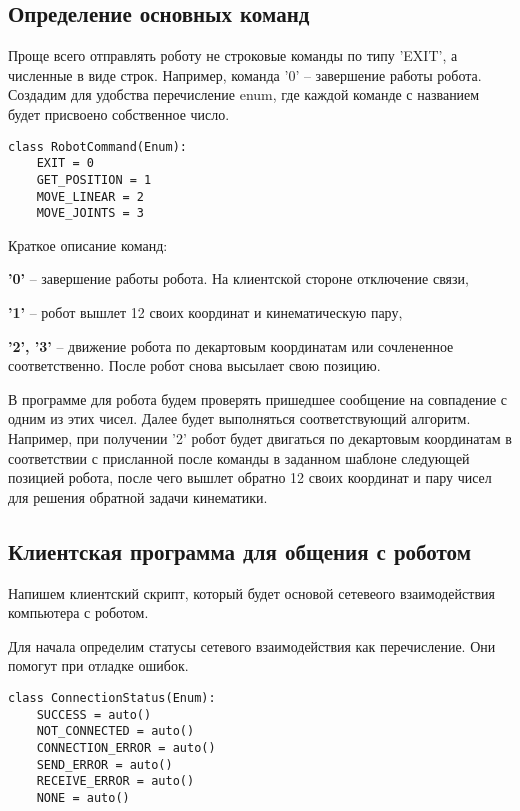 \documentclass[a4paper,14pt]{extarticle}
\begin{document}
\subsection{Определение основных команд}
Проще всего отправлять роботу не строковые команды по типу 'EXIT',
а численные в виде строк. Например, команда '0' -- завершение работы
робота. Создадим для удобства перечисление enum, где каждой
команде с названием будет присвоено собственное число.
\begin{lstlisting}[label=robocmd, caption={Определение перечисления с командами для робота.}]
class RobotCommand(Enum):
    EXIT = 0
    GET_POSITION = 1
    MOVE_LINEAR = 2
    MOVE_JOINTS = 3
\end{lstlisting}


Краткое описание команд:
\begin{compactitem}
    \item \textbf{'0'} -- завершение работы робота. На клиентской стороне отключение связи,
    \item \textbf{'1'} -- робот вышлет 12 своих координат и кинематическую пару,
    \item \textbf{'2', '3'} -- движение робота по декартовым координатам или сочлененное соответственно.
    После робот снова высылает свою позицию.
\end{compactitem}


В программе для робота будем проверять пришедшее сообщение
на совпадение с одним из этих чисел. Далее будет
выполняться соответствующий алгоритм. Например, при получении
'2' робот будет двигаться по декартовым координатам в соответствии
с присланной после команды в заданном шаблоне следующей позицией робота, после чего
вышлет обратно 12 своих координат и пару чисел для решения
обратной задачи кинематики.


\subsection{Клиентская программа для общения с роботом}
Напишем клиентский скрипт, который будет основой сетевеого взаимодействия
компьютера с роботом.


Для начала определим статусы сетевого взаимодействия как перечисление.
Они помогут при отладке ошибок.
\begin{lstlisting}[label=lst:constat, caption={Определение перечисления статусов соединения компьютера с роботом.}]
class ConnectionStatus(Enum):
    SUCCESS = auto()
    NOT_CONNECTED = auto()
    CONNECTION_ERROR = auto()
    SEND_ERROR = auto()
    RECEIVE_ERROR = auto()
    NONE = auto()
\end{lstlisting}
\end{document}
